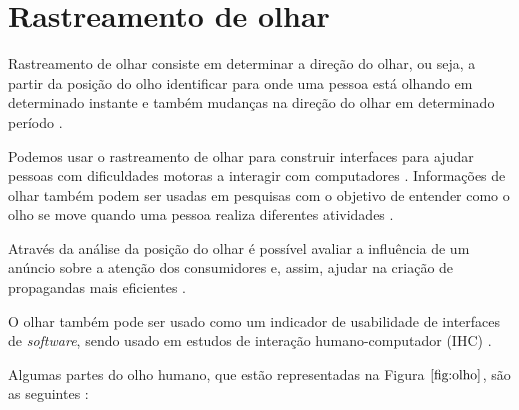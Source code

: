 \chapter{Rastreamento de olhar}


Rastreamento de olhar consiste em determinar a direção do olhar, ou seja, a partir da posição do olho identificar para onde uma pessoa está olhando em determinado instante e também mudanças na direção do olhar em determinado período \cite{lupung}.

Podemos usar o rastreamento de olhar para construir interfaces para ajudar pessoas com dificuldades motoras a interagir com computadores \cite{lidade}. Informações de olhar também podem ser usadas em pesquisas com o objetivo de entender como o olho se move quando uma pessoa realiza diferentes atividades \cite{lupung}.

Através da análise da posição do olhar é possível avaliar a influência de um anúncio sobre a atenção dos consumidores e, assim, ajudar na criação de propagandas mais eficientes \cite{duchowski2002breadth}.

O olhar também pode ser usado como um indicador de usabilidade de interfaces de \textit{software}, sendo usado em estudos de interação humano-computador (IHC) \cite{duchowski2002breadth}.

Algumas partes do olho humano, que estão representadas na Figura $\ref{fig:olho}$,  são as seguintes \cite{lidade}:


